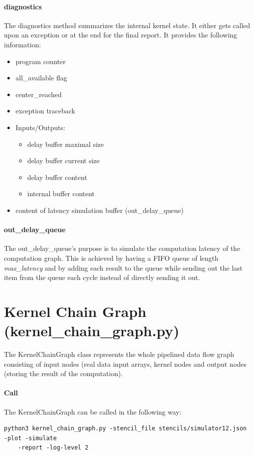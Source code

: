 \paragraph{diagnostics}
The diagnostics method summarizes the internal kernel state. It either gets called upon an exception or at the end for the final report. It provides the following information:
\begin{itemize}
	\item program counter
	\item all\_available flag
	\item center\_reached
	\item exception traceback
	\item Inputs/Outputs:
	\begin{itemize}
		\item delay buffer maximal size
		\item delay buffer current size
		\item delay buffer content
		\item internal buffer content
	\end{itemize}
	\item content of latency simulation buffer (out\_delay\_queue)
\end{itemize}


\paragraph{out\_delay\_queue}
The out\_delay\_queue's purpose is to simulate the computation latency of the computation graph. This is achieved by having a FIFO queue of length \textit{max\_latency} and by adding each result to the queue while sending out the last item from the queue each cycle instead of directly sending it out.







\section{Kernel Chain Graph (kernel\_chain\_graph.py)}
The KernelChainGraph class represents the whole pipelined data flow graph consisting of input nodes (real data input arrays, kernel nodes and output nodes (storing the result of the computation).


\paragraph{Call}
The KernelChainGraph can be called in the following way:
\begin{verbatim}
python3 kernel_chain_graph.py -stencil_file stencils/simulator12.json -plot -simulate 
    -report -log-level 2
\end{verbatim}

